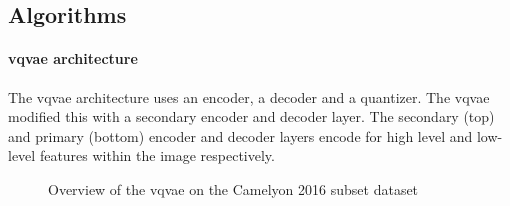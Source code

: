 \documentclass[review]{elsarticle}
\begin{document}
\subsection{Algorithms}
\paragraph{\gls{vqvae} architecture} The \gls{vqvae} architecture uses an encoder, a decoder and a quantizer. The \gls{vqvae} modified this with a secondary encoder and decoder layer. The secondary (top) and primary (bottom) encoder and decoder layers encode for high level and low-level features within the image respectively.


\begin{figure}
    \centering
    \caption{Overview of the \gls{vqvae} on the Camelyon 2016 subset dataset}
    \label{fig:VQVAE_camelyon_2016_overview_diagram}
\end{figure}

    
\end{document}
